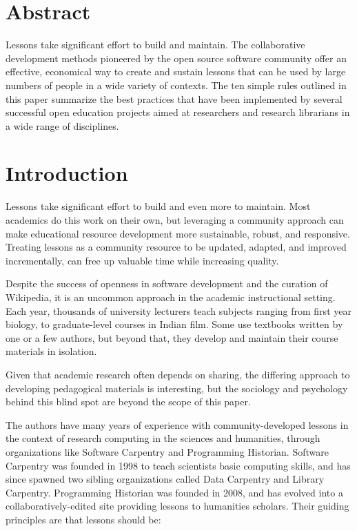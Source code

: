 \documentclass[10pt,letterpaper]{article}
\begin{document}

\linenumbers

\section*{Abstract}

Lessons take significant effort to build and maintain.
The collaborative development methods pioneered by the open source software community
offer an effective, economical way to create and sustain lessons
that can be used by large numbers of people in a wide variety of contexts.
The ten simple rules outlined in this paper
summarize the best practices that have been implemented
by several successful open education projects aimed at researchers and research librarians
in a wide range of disciplines.


\section*{Introduction}

Lessons take significant effort to build and even more to maintain.
Most academics do this work on their own,
but leveraging a community approach
can make educational resource development more sustainable, robust, and responsive.
Treating lessons as a community resource
to be updated, adapted, and improved incrementally,
can free up valuable time while increasing quality.

Despite the success of openness in software development and the curation of Wikipedia,
it is an uncommon approach in the academic instructional setting.
Each year,
thousands of university lecturers teach subjects ranging from first year biology,
to graduate-level courses in Indian film.
Some use textbooks written by one or a few authors,
but beyond that,
they develop and maintain their course materials in isolation.

Given that academic research often depends on sharing, the differing
approach to developing pedagogical materials is interesting,
but the sociology and psychology behind this blind spot are beyond the scope of this paper.


The authors have many years of experience with community-developed lessons
in the context of research computing in the sciences and humanities,
through organizations like Software Carpentry and Programming Historian.
Software Carpentry was founded in 1998 to teach scientists basic computing skills,
and has since spawned two sibling organizations called Data Carpentry and Library Carpentry.
Programming Historian was founded in 2008,
and has evolved into a collaboratively-edited site providing lessons to humanities scholars.
Their guiding principles are that lessons should be:
\end{document}
